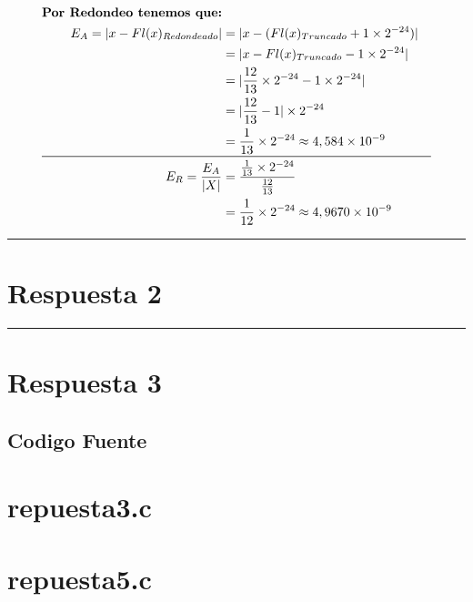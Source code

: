 \documentclass{article}
\begin{document}
\begin{align*}
\text{\textbf{Por Redondeo tenemos que:}} \\
E_{A} = |x - Fl(x)_{Redondeado}| & = |x - (Fl(x)_{Truncado} + 1 \times 2^{-24})| \\
& = |x - Fl(x)_{Truncado} - 1 \times 2^{-24}| \\
& = |\frac{12}{13} \times 2^{-24} - 1 \times 2^{-24}|  \\
& = |\frac{12}{13} - 1| \times 2^{-24} \\
& = \frac{1}{13} \times 2^{-24} \approx 4,584 \times 10^{-9} \\ \midrule
E_{R} = \frac{E_{A}}{|X|} & = \frac{\frac{1}{13} \times 2^{-24}}{\frac{12}{13}} \\
& = \frac{1}{12} \times 2^{-24} \approx 4,9670 \times 10^{-9}
\end{align*}


\hrule
\section*{Respuesta 2}



\hrule
\section*{Respuesta 3}



\newpage
\begin{centering}
	\section*{Codigo Fuente}
\end{centering}

\section*{repuesta3.c}


\newpage
\section*{repuesta5.c}

\end{document}
